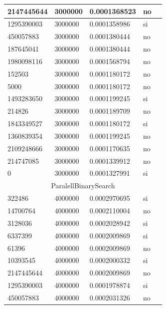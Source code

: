 \documentclass[12pt, fleqn]{article}                             %
\theoremstyle{break}                                            %
\begin{document}
\begin{longtable}{|m{5em}|m{5em}|m{10em}|m{5em}|@{}m{0pt}@{}}
            2147445644& 3000000  & 0.0001368523 & no &\\[1em]    \hline
            1295390003& 3000000  & 0.0001358986 & si &\\[1em]    \hline
            450057883& 3000000  & 0.0001380444 & no &\\[1em]    \hline
            187645041& 3000000  & 0.0001380444 & no &\\[1em]    \hline
            1980098116& 3000000  & 0.0001568794 & no &\\[1em]    \hline
            152503& 3000000  & 0.0001180172 & no &\\[1em]    \hline
            5000& 3000000  & 0.0001180172 & no &\\[1em]    \hline
            1493283650& 3000000  & 0.0001199245 & si &\\[1em]    \hline
            214826& 3000000  & 0.0001189709 & no &\\[1em]    \hline
            1843349527& 3000000  & 0.0001180172 & si &\\[1em]    \hline
            1360839354& 3000000  & 0.0001199245 & no &\\[1em]    \hline
            2109248666& 3000000  & 0.0001170635 & no &\\[1em]    \hline
            214747085& 3000000  & 0.0001339912 & no &\\[1em]    \hline
            0& 3000000  & 0.0001327991 & si &\\[1em]    \hline
            \multicolumn{5}{|c|}{ParalellBinarySearch}   \\          \hline
            322486& 4000000  & 0.0002970695 & si &\\[1em]    \hline
            14700764& 4000000  & 0.0002110004 & no &\\[1em]    \hline
            3128036& 4000000  & 0.0002028942 & si &\\[1em]    \hline
            6337399& 4000000  & 0.0002009869 & si &\\[1em]    \hline
            61396& 4000000  & 0.0002009869 & no &\\[1em]    \hline
            10393545& 4000000  & 0.0002000332 & si &\\[1em]    \hline
            2147445644& 4000000  & 0.0002009869 & no &\\[1em]    \hline
            1295390003& 4000000  & 0.0001978874 & si &\\[1em]    \hline
            450057883& 4000000  & 0.0002031326 & no &\\[1em]    \hline

\end{longtable}
\end{document}
